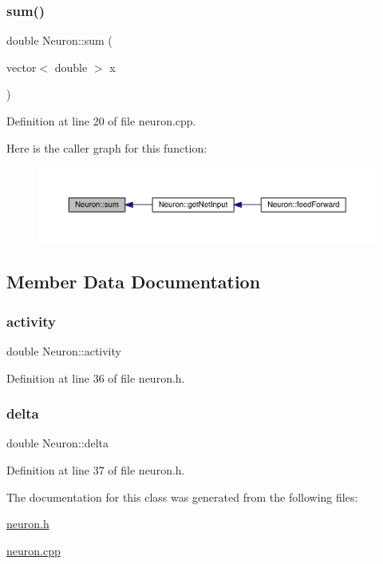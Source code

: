 \subsubsection{\texorpdfstring{sum()}{sum()}}
{\footnotesize\ttfamily double Neuron\+::sum (\begin{DoxyParamCaption}\item[{vector$<$ double $>$}]{x }\end{DoxyParamCaption})\hspace{0.3cm}{\ttfamily [static]}}



Definition at line 20 of file neuron.\+cpp.

Here is the caller graph for this function\+:\nopagebreak
\begin{figure}[H]
\begin{center}
\leavevmode
\includegraphics[width=350pt]{class_neuron_ab151ba9bdd3e9f2aff01e782b41f92e7_icgraph}
\end{center}
\end{figure}


\subsection{Member Data Documentation}
\mbox{\label{class_neuron_a4f763f92e820b748629781dc8791ab9d}} 
\subsubsection{\texorpdfstring{activity}{activity}}
{\footnotesize\ttfamily double Neuron\+::activity}



Definition at line 36 of file neuron.\+h.

\mbox{\label{class_neuron_aa2823ed0557b8296ed5987601bad30ed}} 
\subsubsection{\texorpdfstring{delta}{delta}}
{\footnotesize\ttfamily double Neuron\+::delta}



Definition at line 37 of file neuron.\+h.



The documentation for this class was generated from the following files\+:\begin{DoxyCompactItemize}
\item 
\hyperlink{neuron_8h}{neuron.\+h}\item 
\hyperlink{neuron_8cpp}{neuron.\+cpp}\end{DoxyCompactItemize}
